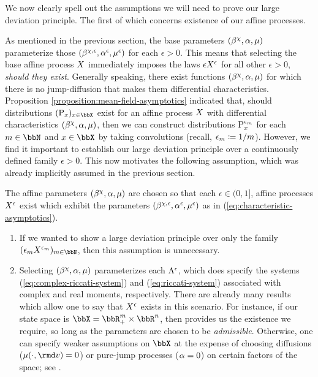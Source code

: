 We now clearly spell out the assumptions we will need to prove our large deviation principle.
The first of which concerns existence of our affine processes.

As mentioned in the previous section, the base parameters $(\beta^\chi, \alpha, \mu)$ parameterize those $(\beta^{\chi,\epsilon}, \alpha^\epsilon, \mu^\epsilon)$ for each $\epsilon > 0$.
This means that selecting the base affine process $X$ immediately imposes the laws $\epsilon X^\epsilon$ for all other $\epsilon > 0$, \emph{should they exist}.
Generally speaking, there exist functions $(\beta^\chi, \alpha, \mu)$ for which there is no jump-diffusion that makes them differential characteristics.
Proposition \ref{proposition:mean-field-asymptotics} indicated that, should distributions $(\Prb_\stateVar)_{\stateVar\in\stateSpace}$ exist for an affine process $X$ with differential characteristics $(\beta^\chi, \alpha, \mu)$, then we can construct distributions ${\operatorname{P}}^{\epsilon_m}_x$ for each $m \in \bbN$ and $\stateVar \in \stateSpace$ by taking convolutions (recall, $\epsilon_m \coloneqq 1/m$).
However, we find it important to establish our large deviation principle over a continuously defined family $\epsilon > 0$.
This now motivates the following assumption, which was already implicitly assumed in the previous section.
\begin{assumption}
  The affine parameters $(\beta^\chi, \alpha, \mu)$ are chosen so that each $\epsilon \in (0,1]$, affine processes $X^\epsilon$ exist which exhibit the parameters $(\beta^{\chi,\epsilon}, \alpha^\epsilon, \mu^\epsilon)$ as in (\ref{eq:characteristic-asymptotics}).
\end{assumption}
\begin{remark}
  \begin{enumerate}[label=(\alph*)]
    \item
      If we wanted to show a large deviation principle over only the family $(\epsilon_m \X^{\epsilon_m})_{m\in\bbN}$, then this assumption is unnecessary.
    \item
      Selecting $(\beta^\chi, \alpha, \mu)$ parameterizes each $\Lambda^\epsilon$, which does specify the systems (\ref{eq:complex-riccati-system}) and (\ref{eq:riccati-system}) associated with complex and real moments, respectively.
      There are already many results which allow one to say that $X^\epsilon$ exists in this scenario.
      For instance, if our state space is $\stateSpace = \bbR^m_+ \times \bbR^n$, then \cite[Proposition 7.4]{duffie2003} provides us the existence we require, so long as the parameters are chosen to be \emph{admissible}.
      Otherwise, one can specify weaker assumptions on $\stateSpace$ at the expense of choosing diffusions ($\affJump(\cdot, \rmd\markVar) = 0$) or pure-jump processes ($\alpha = 0$) on certain factors of the space; see \cite[Section 2.5, Section 3.4]{cuchiero2011}.
  \end{enumerate}
\end{remark}

